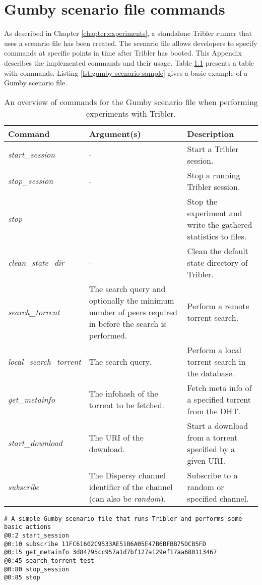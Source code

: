 \chapter{Gumby scenario file commands}
\label{appendix:gumby-scenario-commands}
As described in Chapter \ref{chapter:experiments}, a standalone Tribler runner that uses a scenario file has been created. The scenario file allows developers to specify commands at specific points in time after Tribler has booted. This Appendix describes the implemented commands and their usage. Table \ref{table:gumby-scenario-file} presents a table with commands. Listing \ref{lst:gumby-scenario-sample} gives a basic example of a Gumby scenario file.

\begin{table}[h!]
	\begin{tabularx}{\textwidth}{|X|X|X|}
		\hline
		\textbf{Command} & \textbf{Argument(s)} & \textbf{Description}\\ \hline
		\emph{start\_session} & - & Start a Tribler session.\\ \hline
		\emph{stop\_session} & - & Stop a running Tribler session.\\ \hline
		\emph{stop} & - & Stop the experiment and write the gathered statistics to files.\\ \hline
		\emph{clean\_state\_dir} & - & Clean the default state directory of Tribler.\\ \hline
		\emph{search\_torrent} & The search query and optionally the minimum number of peers required in before the search is performed. & Perform a remote torrent search.\\ \hline
		\emph{local\_search\_torrent} & The search query. & Perform a local torrent search in the database.\\ \hline
		\emph{get\_metainfo} & The infohash of the torrent to be fetched. & Fetch meta info of a specified torrent from the DHT.\\ \hline
		\emph{start\_download} & The URI of the download. & Start a download from a torrent specified by a given URI.\\ \hline
		\emph{subscribe} & The Dispersy channel identifier of the channel (can also be \emph{random}). & Subscribe to a random or specified channel.\\ \hline
	\end{tabularx}
	\caption{An overview of commands for the Gumby scenario file when performing experiments with Tribler.}
	\label{table:gumby-scenario-file}
\end{table}

\begin{lstlisting}[caption={An example of a Gumby scenario file.},label={lst:gumby-scenario-sample}]
# A simple Gumby scenario file that runs Tribler and performs some basic actions
@0:2 start_session
@0:10 subscribe 11FC61602C9533AE51B6A05E47B6BFBB75DCB5FD
@0:15 get_metainfo 3d84795cc957a1d7bf127a129ef17aa680113467
@0:45 search_torrent test
@0:80 stop_session
@0:85 stop
\end{lstlisting}